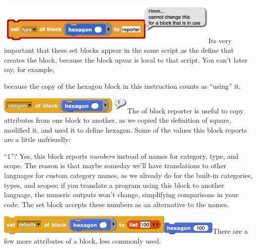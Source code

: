 \includegraphics[width=4.31in,height=0.83in]{media/image952.png}It\textquotesingle s
very important that these set blocks appear in the same script as the
define that creates the block, because the block upvar is local to that
script. You can't later say, for example,

because the copy of the hexagon block in this instruction counts as
``using'' it.

\includegraphics[width=2.6in,height=0.32in]{media/image953.png}The of
block reporter is useful to copy attributes from one block to another,
as we copied the definition of square, modified it, and used it to
define hexagon. Some of the values this block reports are a little
unfriendly:

``1''? Yes, this block reports \emph{numbers} instead of names for
category, type, and scope. The reason is that maybe someday we'll have
translations to other languages for custom category names, as we already
do for the built-in categories, types, and scopes; if you translate a
program using this block to another language, the numeric outputs won't
change, simplifying comparisons in your code. The set block accepts
these numbers as an alternative to the names.

\includegraphics[width=3.37986in,height=0.37986in]{media/image954.png}\includegraphics[width=1.02in,height=0.25in]{media/image955.png}There
are a few more attributes of a block, less commonly used.

